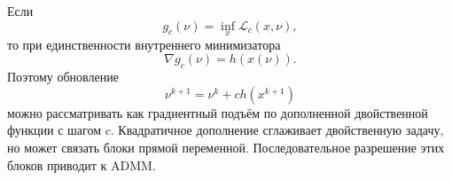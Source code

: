 Если
\[
    g_c(\nu)
    =
    \inf_x\mathcal L_c(x,\nu),
\]
то при единственности внутреннего минимизатора
\[
    \nabla g_c(\nu)=h(x(\nu)).
\]
Поэтому обновление
\[
    \nu^{k+1}
    =
    \nu^k+ch(x^{k+1})
\]
можно рассматривать как градиентный подъём по дополненной двойственной
функции с шагом \(c\). Квадратичное дополнение сглаживает двойственную
задачу, но может связать блоки прямой переменной. Последовательное
разрешение этих блоков приводит к ADMM.

